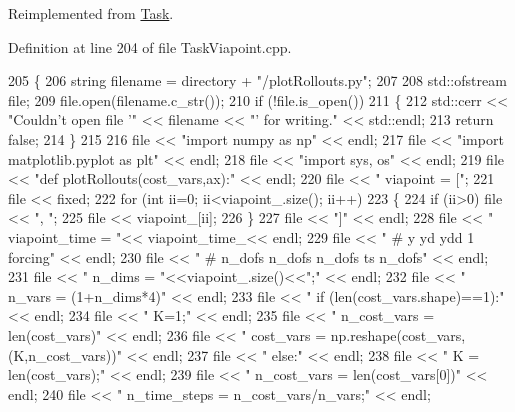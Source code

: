 Reimplemented from \hyperlink{classDmpBbo_1_1Task_aed72bdbcdd0ed6359fa863b5a057adb7}{Task}.



Definition at line 204 of file Task\+Viapoint.\+cpp.


\begin{DoxyCode}
205 \{
206   \textcolor{keywordtype}{string} filename = directory + \textcolor{stringliteral}{"/plotRollouts.py"};
207   
208   std::ofstream file;
209   file.open(filename.c\_str());
210   \textcolor{keywordflow}{if} (!file.is\_open())
211   \{
212     std::cerr << \textcolor{stringliteral}{"Couldn't open file '"} << filename << \textcolor{stringliteral}{"' for writing."} << std::endl;
213     \textcolor{keywordflow}{return} \textcolor{keyword}{false};
214   \}
215 
216   file << \textcolor{stringliteral}{"import numpy as np"} << endl;
217   file << \textcolor{stringliteral}{"import matplotlib.pyplot as plt"} << endl;
218   file << \textcolor{stringliteral}{"import sys, os"} << endl;
219   file << \textcolor{stringliteral}{"def plotRollouts(cost\_vars,ax):"} << endl;
220   file << \textcolor{stringliteral}{"    viapoint = ["};
221   file << fixed;
222   \textcolor{keywordflow}{for} (\textcolor{keywordtype}{int} ii=0; ii<viapoint\_.size(); ii++)
223   \{
224     \textcolor{keywordflow}{if} (ii>0) file << \textcolor{stringliteral}{", "};
225     file << viapoint\_[ii];
226   \}
227   file << \textcolor{stringliteral}{"]"} << endl;
228   file << \textcolor{stringliteral}{"    viapoint\_time = "}<< viapoint\_time\_<< endl;
229   file << \textcolor{stringliteral}{"    # y      yd     ydd    1  forcing"} << endl;
230   file << \textcolor{stringliteral}{"    # n\_dofs n\_dofs n\_dofs ts n\_dofs"} << endl;
231   file << \textcolor{stringliteral}{"    n\_dims = "}<<viapoint\_.size()<<\textcolor{stringliteral}{";"} << endl;
232   file << \textcolor{stringliteral}{"    n\_vars = (1+n\_dims*4)"} << endl;
233   file << \textcolor{stringliteral}{"    if (len(cost\_vars.shape)==1):"} << endl;
234   file << \textcolor{stringliteral}{"        K=1;"} << endl;
235   file << \textcolor{stringliteral}{"        n\_cost\_vars = len(cost\_vars)"} << endl;
236   file << \textcolor{stringliteral}{"        cost\_vars = np.reshape(cost\_vars,(K,n\_cost\_vars))"} << endl;
237   file << \textcolor{stringliteral}{"    else:"} << endl;
238   file << \textcolor{stringliteral}{"        K = len(cost\_vars);"} << endl;
239   file << \textcolor{stringliteral}{"        n\_cost\_vars = len(cost\_vars[0])"} << endl;
240   file << \textcolor{stringliteral}{"    n\_time\_steps = n\_cost\_vars/n\_vars;"} << endl;

\end{DoxyCode}
